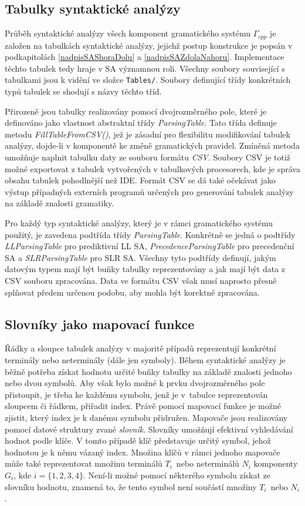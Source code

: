\subsection*{Tabulky syntaktické analýzy}
Průběh syntaktické analýzy všech komponent gramatického systému $\Gamma_{cpp}$ je založen na tabulkách syntaktické analýzy, jejichž postup konstrukce je popsán v podkapitolách
\ref{nadpisSAShoraDolu} a \ref{nadpisSAZdolaNahoru}. Implementace těchto tabulek tedy hraje v SA  významnou roli. Všechny soubory související s tabulkami jsou k vidění ve
složce \verb|Tables/|. Soubory definující třídy konkrétních typů tabulek se shodují s názvy těchto tříd.

Přirozeně jsou tabulky realizovány pomocí dvojrozměrného pole, které je definováno jako vlastnost abstraktní třídy \emph{ParsingTable}. Tato třída definuje
metodu \emph{FillTableFromCSV()}, jež je zásadní pro flexibilitu modifikování tabulek analýzy, dojde-li v komponentě ke změně gramatických pravidel. Zmíněná metoda
umožňuje naplnit tabulku daty ze souboru formátu \emph{CSV}. Soubory CSV je totiž možné exportovat z tabulek vytvořených v tabulkových procesorech, kde je správa
obsahu tabulek pohodlnější než IDE. Formát CSV se dá také očekávat jako výstup případných externích programů určených pro generování tabulek analýzy na základě
znalosti gramatiky.

Pro každý typ syntaktické analýzy, který je v rámci gramatického systému použitý, je zavedena podtřída třídy \emph{ParsingTable}. Konkrétně se jedná o podtřídy
\emph{LLParsingTable} pro prediktivní LL SA, \emph{PrecedenceParsingTable} pro precedenční SA a \emph{SLRParsingTable} pro SLR SA. Všechny tyto podtřídy definují,
jakým datovým typem mají být buňky tabulky reprezentovány a jak mají být data z CSV souboru zpracována. Data ve formátu CSV však musí naprosto přesně splňovat předem určenou podobu,
aby mohla být korektně zpracována.

\subsection*{Slovníky jako mapovací funkce}
Řádky a sloupce tabulek analýzy v majoritě případů reprezentují konkrétní terminály nebo neterminály (dále jen symboly). Během syntaktické analýzy je běžně
potřeba získat hodnotu určité buňky tabulky na základě znalosti jednoho nebo dvou symbolů. Aby však bylo možné k prvku dvojrozměrného pole přistoupit, je třeba ke každému
symbolu, jenž je v~tabulce reprezentován sloupcem či řádkem, přiřadit index. Právě pomocí mapovací funkce je možné zjistit, který index je k danému symbolu přidružen.
Mapovače jsou realizovány pomocí datové struktury zvané \emph{slovník}. Slovníky umožňují efektivní vyhledávání hodnot podle klíče. V tomto případě klíč představuje
určitý symbol, jehož hodnotou je k němu vázaný index. Množina klíčů v rámci jednoho mapovače může také reprezentovat množinu terminálů $T_i$~nebo neterminálů $N_i$ komponenty
$G_i$, kde $i = \{1, 2, 3, 4\}$. Není-li možné pomocí některého symbolu získat ze slovníku hodnotu, znamená to, že tento symbol není součástí množiny $T_i$~nebo $N_i$.

